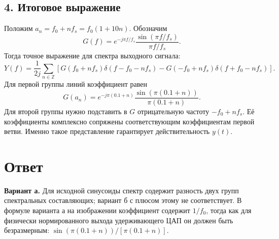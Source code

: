 \documentclass[12pt,a4paper]{article}
\begin{document}
\subsection*{4. Итоговое выражение}
Положим $a_n=f_0+nf_s=f_0(1+10n)$. Обозначим
\[
G(f)=e^{-j\pi f/f_s}\frac{\sin(\pi f/f_s)}{\pi f/f_s}.
\]
Тогда точное выражение для спектра выходного сигнала:
\[
\boxed{\displaystyle
Y(f)=\frac{1}{2j}\sum_{n\in\mathbb Z}
\left[G(f_0+nf_s)\delta(f-f_0-nf_s)
-G(-f_0+nf_s)\delta(f+f_0-nf_s)\right].}
\]
Для первой группы линий коэффициент равен
\[
G(a_n)=e^{-j\pi(0.1+n)}
\frac{\sin(\pi(0.1+n))}{\pi(0.1+n)}.
\]
Для второй группы нужно подставить в $G$ отрицательную
частоту $-f_0+nf_s$. Её коэффициенты комплексно сопряжены
соответствующим коэффициентам первой ветви. Именно такое
представление гарантирует действительность $y(t)$.

\section*{Ответ}
\textbf{Вариант а.} Для исходной синусоиды спектр содержит
разность двух групп спектральных составляющих; вариант б с плюсом
этому не соответствует. В формуле варианта а на изображении
коэффициент содержит $1/f_0$, тогда как для физически нормированного
выхода удерживающего ЦАП он должен быть безразмерным:
$\sin(\pi(0.1+n))/[\pi(0.1+n)]$.
\end{document}
